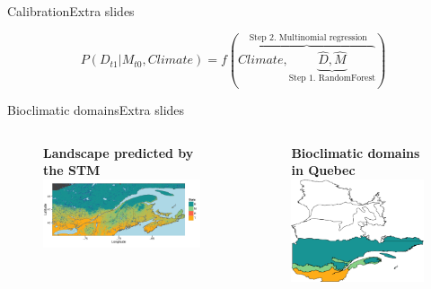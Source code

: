 \documentclass[10pt,aspectratio=149]{beamer}
\begin{document}

\begin{frame}{Calibration}{Extra slides}

	\begin{equation}
		P(D_{t1}|M_{t0}, Climate) = f(\overbrace{Climate, \underbrace{\hat{D}, \hat{M}}_\text{Step 1. RandomForest}}^\text{ Step 2. Multinomial regression})
	\label{eq1}
	\end{equation}

\end{frame}

\begin{frame}{Bioclimatic domains}{Extra slides}

	  \begin{columns}[t]
        \begin{column}[c]{0.60\linewidth}
		\begin{figure}
			\centering \textbf{Landscape predicted by the STM}
			\includegraphics[width=0.55\paperwidth]{Figs/338_500ts_final_land.pdf}
		\end{figure}
        \end{column}
		\hspace{1em}
        \begin{column}[c]{0.35\linewidth}
		\begin{figure}
			\centering \textbf{Bioclimatic domains in Quebec}
			\includegraphics[width=0.30\paperwidth]{Figs/ss_veg_map.pdf}
		\end{figure}
        \end{column}
      \end{columns}




\end{frame}
\end{document}
